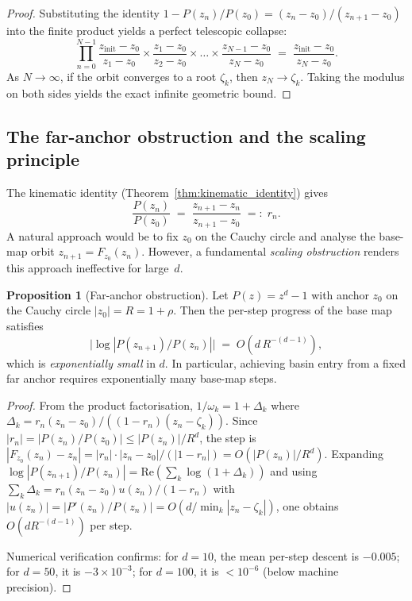 \documentclass[11pt,a4paper]{article}
\theoremstyle{definition}
\newtheorem{proposition}{Proposition}[section]
\begin{document}
\begin{proof}
Substituting the identity $1 - P(z_n)/P(z_0) = (z_n - z_0)/(z_{n+1} - z_0)$ into the finite product yields a perfect telescopic collapse:
\[
  \prod_{n=0}^{N-1} \frac{z_{\mathrm{init}} - z_0}{z_1 - z_0} \times \frac{z_1 - z_0}{z_2 - z_0} \times \dots \times \frac{z_{N-1} - z_0}{z_N - z_0} \;=\; \frac{z_{\mathrm{init}} - z_0}{z_N - z_0}.
\]
As $N \to \infty$, if the orbit converges to a root $\zeta_k$, then $z_N \to \zeta_k$. Taking the modulus on both sides yields the exact infinite geometric bound.
\end{proof}

\subsection{The far-anchor obstruction and the scaling principle}
\label{sec:far_anchor_obstruction}

The kinematic identity (Theorem~\ref{thm:kinematic_identity}) gives
\begin{equation}
  \label{eq:kinematic_ratio}
  \frac{P(z_n)}{P(z_0)}
  \;=\; \frac{z_{n+1} - z_n}{z_{n+1} - z_0}
  \;=:\; r_n.
\end{equation}
A natural approach would be to fix $z_0$ on the Cauchy circle and analyse the base-map orbit $z_{n+1} = F_{z_0}(z_n)$.  However, a fundamental \emph{scaling obstruction} renders this approach ineffective for large~$d$.

\begin{proposition}[Far-anchor obstruction]
\label{prop:far_anchor}
Let $P(z) = z^d - 1$ with anchor $z_0$ on the Cauchy circle $|z_0| = R = 1 + \rho$.  Then the per-step progress of the base map satisfies
\begin{equation}
  \label{eq:far_anchor_rate}
  \bigl|\log|P(z_{n+1})/P(z_n)|\bigr| \;=\; O\!\left(d\,R^{-(d-1)}\right),
\end{equation}
which is \emph{exponentially small} in $d$.  In particular, achieving basin entry from a fixed far anchor requires exponentially many base-map steps.
\end{proposition}

\begin{proof}
From the product factorisation, $1/\omega_k = 1 + \Delta_k$ where $\Delta_k = r_n(z_n - z_0)/((1-r_n)(z_n - \zeta_k))$.  Since $|r_n| = |P(z_n)/P(z_0)| \leq |P(z_n)|/R^d$, the step is $|F_{z_0}(z_n) - z_n| = |r_n| \cdot |z_n - z_0|/(|1 - r_n|) = O(|P(z_n)|/R^d)$.  Expanding $\log|P(z_{n+1})/P(z_n)| = \text{Re}(\sum_k \log(1 + \Delta_k))$ and using $\sum_k \Delta_k = r_n(z_n - z_0)u(z_n)/(1-r_n)$ with $|u(z_n)| = |P'(z_n)/P(z_n)| = O(d/\min_k|z_n - \zeta_k|)$, one obtains $O(d R^{-(d-1)})$ per step.

Numerical verification confirms: for $d = 10$, the mean per-step descent is $-0.005$; for $d = 50$, it is $-3 \times 10^{-3}$; for $d = 100$, it is $< 10^{-6}$ (below machine precision).
\end{proof}
\end{document}
